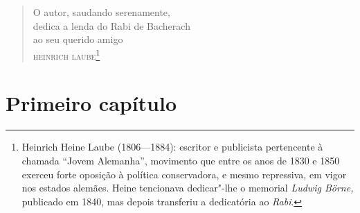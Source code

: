 \chapter*{}
\thispagestyle{empty}

\vspace*{4cm}
\begin{verse}
O autor, saudando serenamente,\\
dedica a lenda do Rabi de Bacherach\\
ao seu querido amigo\\
\qquad\qquad\qquad\qquad\textsc{heinrich laube}\footnote[*]{
Heinrich Heine Laube (1806---1884): escritor e publicista pertencente à
chamada ``Jovem Alemanha'', movimento que entre os anos de 1830 e 1850
exerceu forte oposição à política conservadora, e mesmo repressiva, em
vigor nos estados alemães. Heine tencionava dedicar"-lhe o memorial
\textit{Ludwig Börne, }publicado em 1840, mas depois transferiu a
dedicatória ao \textit{Rabi}.}

\end{verse}

\chapter[Primeiro capítulo]{Primeiro capítulo}


\vspace{2.5cm}

